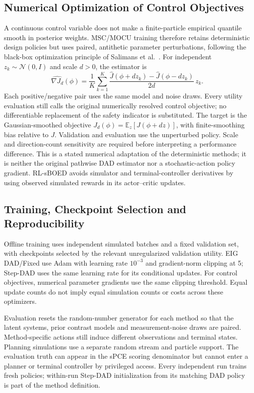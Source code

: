 \documentclass[journal]{IEEEtran}
\newcommand{\E}{\mathbb E}
\begin{document}
\subsection{Numerical Optimization of Control Objectives}
A continuous control variable does not make a finite-particle empirical
quantile smooth in posterior weights. MSC/MOCU training therefore retains
deterministic design policies but uses paired, antithetic parameter
perturbations, following the black-box optimization principle of
Salimans et al.~\cite{salimans2017es}. For independent
$z_k\sim\mathcal N(0,I)$ and scale $d>0$, the estimator is
\begin{equation}
\widehat{\nabla J_d}(\phi)=\frac1K\sum_{k=1}^K
\frac{\widehat J(\phi+d z_k)-\widehat J(\phi-d z_k)}{2d}\,z_k.
\label{eq:numerical-gradient}
\end{equation}
Each positive/negative pair uses the same model and noise draws. Every utility
evaluation still calls the original numerically resolved control objective;
no differentiable replacement of the safety indicator is substituted.
The target is the Gaussian-smoothed objective
$J_d(\phi)=\E_z[J(\phi+dz)]$, with finite-smoothing bias relative to $J$.
Validation and evaluation use the unperturbed policy. Scale and direction-count
sensitivity are required before interpreting a performance difference.
This is a stated numerical adaptation of the deterministic methods; it is
neither the original pathwise DAD estimator nor a stochastic-action policy
gradient. RL-sBOED avoids simulator and terminal-controller derivatives by
using observed simulated rewards in its actor--critic updates.

\subsection{Training, Checkpoint Selection and Reproducibility}
Offline training uses independent simulated batches and a fixed validation
set, with checkpoints selected by the relevant unregularized validation
utility. EIG DAD/Fixed use Adam with learning rate $10^{-3}$ and gradient-norm
clipping at 5; Step-DAD uses the same learning rate for its conditional updates.
For control objectives, numerical parameter gradients use the same clipping
threshold. Equal update counts do not imply equal simulation counts or costs
across these optimizers.

Evaluation resets the random-number generator for each method so that the
latent systems, prior contrast models and measurement-noise draws are paired.
Method-specific actions still induce different observations and terminal
states. Planning simulations use a separate random stream and particle support.
The evaluation truth can appear in the sPCE scoring denominator but cannot
enter a planner or terminal controller by privileged access. Every independent
run trains fresh policies; within-run Step-DAD initialization from its matching
DAD policy is part of the method definition.
\end{document}

